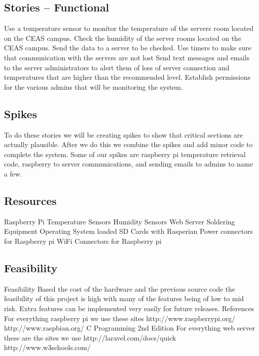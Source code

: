 \documentclass{report}
\begin{document}
\newpage
\subsection*{Stories -- Functional}
Use a temperature sensor to monitor the temperature of the servers room located on the CEAS campus.
Check the humidity of the server rooms located on the CEAS campus.
Send the data to a server to be checked.
Use timers to make sure that communication with the servers are not lost
Send text messages and emails to the server administrators to alert them of loss of server connection and temperatures that are higher than the recommended level.
Establish permissions for the various admins that will be monitoring the system.

\newpage
\subsection*{Spikes}
	To do these stories we will be creating spikes to show that critical sections are actually plausible. After we do this we combine the spikes and add minor code to complete the system. Some of our spikes are raspberry pi temperature retrieval code, raspberry to server communications, and sending emails to admins to name a few. 
\newpage
\subsection*{Resources}
Raspberry Pi
Temperature Sensors
Humidity Sensors
Web Server
Soldering Equipment
Operating System loaded SD Cards with Rasperian
Power connectors for Raspberry pi
WiFi Connectors for Raspberry pi
\newpage
\subsection*{Feasibility}
Feasibility
	Based the cost of the hardware and the previous source code the feasibility of this project is high with many of the features being of low to mid risk. Extra features can be implemented very easily for future releases.
References
	For everything raspberry pi we use these sites
http://www.raspberrypi.org/
http://www.raspbian.org/
C Programming 2nd Edition
For everything web server these are the sites we use
	http://laravel.com/docs/quick
http://www.w3schools.com/
\newpage
\end{document}
